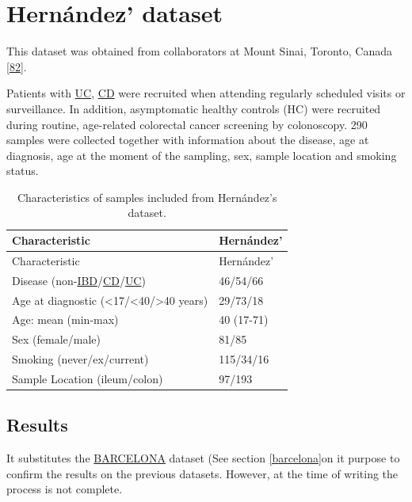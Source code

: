 \documentclass[
  12pt,
  a4paper,
  twoside,
  openright]{book}
\begin{document}
\hypertarget{hernandez}{%
\section{Hernández' dataset}\label{hernandez}}

This dataset was obtained from collaborators at Mount Sinai, Toronto, Canada {[}\protect\hyperlink{ref-hernuxe1ndez-rocha2021}{82}{]}.

Patients with \protect\hyperlink{acronyms_UC}{UC}, \protect\hyperlink{acronyms_CD}{CD} were recruited when attending regularly scheduled visits or surveillance.
In addition, asymptomatic healthy controls (HC) were recruited during routine, age-related colorectal cancer screening by colonoscopy.
290 samples were collected together with information about the disease, age at diagnosis, age at the moment of the sampling, sex, sample location and smoking status.

\begin{longtable}[]{@{}ll@{}}
\caption{\label{tab:hernandez} Characteristics of samples included from Hernández's dataset.}\tabularnewline
\toprule
Characteristic & Hernández' \\
\midrule
\endfirsthead
\toprule
Characteristic & Hernández' \\
\midrule
\endhead
Disease (non-\protect\hyperlink{acronyms_IBD}{IBD}/\protect\hyperlink{acronyms_CD}{CD}/\protect\hyperlink{acronyms_UC}{UC}) & 46/54/66 \\
Age at diagnostic (\textless17/\textless40/\textgreater40 years) & 29/73/18 \\
Age: mean (min-max) & 40 (17-71) \\
Sex (female/male) & 81/85 \\
Smoking (never/ex/current) & 115/34/16 \\
Sample Location (ileum/colon) & 97/193 \\
\bottomrule
\end{longtable}

\hypertarget{results-hernandez}{%
\subsection{Results}\label{results-hernandez}}

It substitutes the \protect\hyperlink{acronyms_BARCELONA}{BARCELONA} dataset (See section \ref{barcelona}on it purpose to confirm the results on the previous datasets.
However, at the time of writing the process is not complete.
\end{document}

